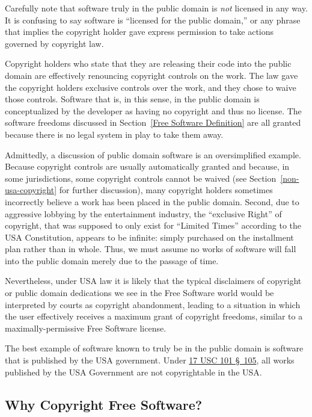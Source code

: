 Carefully note that software truly in the public domain is \emph{not} licensed
in any way.  It is confusing to say software is ``licensed for the
public domain,'' or any phrase that implies the copyright holder gave
express permission to take actions governed by copyright law.

Copyright holders who state that they are releasing their code into
the public domain are effectively renouncing copyright controls on
the work.  The law gave the copyright holders exclusive controls over the
work, and they chose to waive those controls.  Software that is, in
this sense, in the public domain
is conceptualized by the developer as having no copyright and thus no license. The software freedoms discussed in
Section~\ref{Free Software Definition} are all granted because there is no
legal system in play to take them away.

Admittedly, a discussion of public domain software is an oversimplified
example.  
Because copyright controls are usually automatically granted and because, in
some jurisdictions, some copyright controls cannot be waived (see
Section~\ref{non-usa-copyright} for further discussion), many copyright
holders sometimes incorrectly believe a work has been placed in the public
domain.  Second, due to aggressive lobbying by the entertainment industry,
the ``exclusive Right'' of copyright, that was supposed to only exist for
``Limited Times'' according to the USA Constitution, appears to be infinite:
simply purchased on the installment plan rather than in whole.  Thus, we must
assume no works of software will fall into the public domain merely due to
the passage of time.

Nevertheless, under USA law it is likely that the typical
disclaimers of copyright or public domain dedications we see in the
Free Software world would be interpreted by courts as copyright
abandonment, leading to a situation in which the user effectively receives a
maximum grant of copyright freedoms, similar to a maximally-permissive
Free Software license.

The best example of software known to truly be in the public domain is software
that is published by the USA government.  Under
\href{http://www.law.cornell.edu/uscode/text/17/105}{17 USC 101 \S~105}, all
works published by the USA Government are not copyrightable in the USA.

\subsection{Why Copyright Free Software?}

